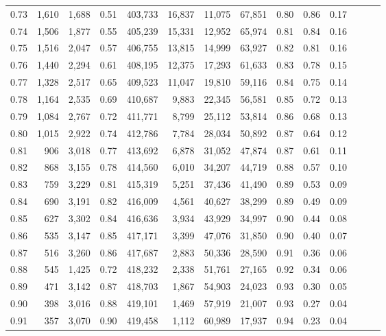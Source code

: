 \begin{tabular}{rrrrrrrrrrrrrr}
0.73 &  1,610 &  1,688 &  0.51 &  403,733 &   16,837 &  11,075 &  67,851 &  0.80 &  0.86 &      0.17 \\
0.74 &  1,506 &  1,877 &  0.55 &  405,239 &   15,331 &  12,952 &  65,974 &  0.81 &  0.84 &      0.16 \\
0.75 &  1,516 &  2,047 &  0.57 &  406,755 &   13,815 &  14,999 &  63,927 &  0.82 &  0.81 &      0.16 \\
0.76 &  1,440 &  2,294 &  0.61 &  408,195 &   12,375 &  17,293 &  61,633 &  0.83 &  0.78 &      0.15 \\
0.77 &  1,328 &  2,517 &  0.65 &  409,523 &   11,047 &  19,810 &  59,116 &  0.84 &  0.75 &      0.14 \\
0.78 &  1,164 &  2,535 &  0.69 &  410,687 &    9,883 &  22,345 &  56,581 &  0.85 &  0.72 &      0.13 \\
0.79 &  1,084 &  2,767 &  0.72 &  411,771 &    8,799 &  25,112 &  53,814 &  0.86 &  0.68 &      0.13 \\
0.80 &  1,015 &  2,922 &  0.74 &  412,786 &    7,784 &  28,034 &  50,892 &  0.87 &  0.64 &      0.12 \\
0.81 &    906 &  3,018 &  0.77 &  413,692 &    6,878 &  31,052 &  47,874 &  0.87 &  0.61 &      0.11 \\
0.82 &    868 &  3,155 &  0.78 &  414,560 &    6,010 &  34,207 &  44,719 &  0.88 &  0.57 &      0.10 \\
0.83 &    759 &  3,229 &  0.81 &  415,319 &    5,251 &  37,436 &  41,490 &  0.89 &  0.53 &      0.09 \\
0.84 &    690 &  3,191 &  0.82 &  416,009 &    4,561 &  40,627 &  38,299 &  0.89 &  0.49 &      0.09 \\
0.85 &    627 &  3,302 &  0.84 &  416,636 &    3,934 &  43,929 &  34,997 &  0.90 &  0.44 &      0.08 \\
0.86 &    535 &  3,147 &  0.85 &  417,171 &    3,399 &  47,076 &  31,850 &  0.90 &  0.40 &      0.07 \\
0.87 &    516 &  3,260 &  0.86 &  417,687 &    2,883 &  50,336 &  28,590 &  0.91 &  0.36 &      0.06 \\
0.88 &    545 &  1,425 &  0.72 &  418,232 &    2,338 &  51,761 &  27,165 &  0.92 &  0.34 &      0.06 \\
0.89 &    471 &  3,142 &  0.87 &  418,703 &    1,867 &  54,903 &  24,023 &  0.93 &  0.30 &      0.05 \\
0.90 &    398 &  3,016 &  0.88 &  419,101 &    1,469 &  57,919 &  21,007 &  0.93 &  0.27 &      0.04 \\
0.91 &    357 &  3,070 &  0.90 &  419,458 &    1,112 &  60,989 &  17,937 &  0.94 &  0.23 &      0.04 \\

\end{tabular}
